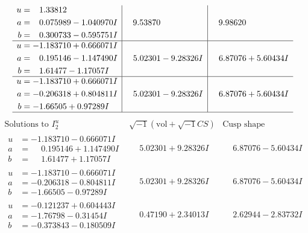 \documentclass[1p]{elsarticle_modified}
\theoremstyle{definition}
\newcommand{\I}{\sqrt{-1}}
\begin{document}
$$\begin{array}{c|c|c}
\begin{aligned}
u &= \phantom{-}1.33812\phantom{ +0.000000I} \\
a &= \phantom{-}0.075989 - 1.040970 I \\
b &= \phantom{-}0.300733 - 0.595751 I\end{aligned}
 & \phantom{-}9.53870\phantom{ +0.000000I} & \phantom{-}9.98620\phantom{ +0.000000I} \\ \hline\begin{aligned}
u &= -1.183710 + 0.666071 I \\
a &= \phantom{-}0.195146 - 1.147490 I \\
b &= \phantom{-}1.61477 - 1.17057 I\end{aligned}
 & \phantom{-}5.02301 - 9.28326 I & \phantom{-}6.87076 + 5.60434 I \\ \hline\begin{aligned}
u &= -1.183710 + 0.666071 I \\
a &= -0.206318 + 0.804811 I \\
b &= -1.66505 + 0.97289 I\end{aligned}
 & \phantom{-}5.02301 - 9.28326 I & \phantom{-}6.87076 + 5.60434 I\\
 \hline 
 \end{array}$$\newpage$$\begin{array}{c|c|c}  
\text{Solutions to }I^u_{2}& \I (\text{vol} + \sqrt{-1}CS) & \text{Cusp shape}\\
 \hline 
\begin{aligned}
u &= -1.183710 - 0.666071 I \\
a &= \phantom{-}0.195146 + 1.147490 I \\
b &= \phantom{-}1.61477 + 1.17057 I\end{aligned}
 & \phantom{-}5.02301 + 9.28326 I & \phantom{-}6.87076 - 5.60434 I \\ \hline\begin{aligned}
u &= -1.183710 - 0.666071 I \\
a &= -0.206318 - 0.804811 I \\
b &= -1.66505 - 0.97289 I\end{aligned}
 & \phantom{-}5.02301 + 9.28326 I & \phantom{-}6.87076 - 5.60434 I \\ \hline\begin{aligned}
u &= -0.121237 + 0.604443 I \\
a &= -1.76798 - 0.31454 I \\
b &= -0.373843 - 0.180509 I\end{aligned}
 & \phantom{-}0.47190 + 2.34013 I & \phantom{-}2.62944 - 2.83732 I \\ \hline\begin{aligned}

\end{aligned}
\end{array}$$
\end{document}
